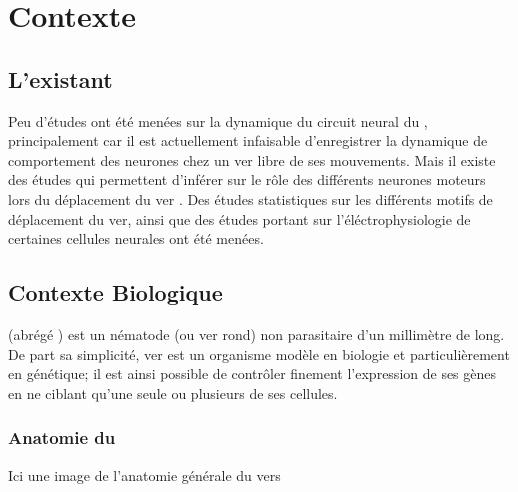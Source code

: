 \chapter{Contexte} %
\label{cha:Contexte}

\section{L'existant} %
\label{sec:L'existant}

Peu d'études ont été menées sur la dynamique du circuit neural du \celeg{},
principalement car il est actuellement infaisable d'enregistrer la dynamique de
comportement des neurones chez un ver libre de ses mouvements.  Mais il existe
des études qui permettent d'inférer sur le rôle des différents neurones moteurs
lors du déplacement du ver \cite{Yanik2006,Chronis2007,Leifer2011}.  Des études
statistiques sur les différents motifs de déplacement \cite{Gray2005} du ver,
ainsi que des études portant sur l'éléctrophysiologie de certaines cellules
neurales \cite{Mellem2008a,Lockery2009} ont été menées.


\section{Contexte Biologique} %
\label{sec:Contexte Biologique}

\caeleg{} (abrégé \celeg{}) est un nématode (ou ver rond) non parasitaire d'un
millimètre de long. De part sa simplicité, ver est un organisme modèle en biologie
et particulièrement en génétique; il est ainsi possible de contrôler
finement l'expression de ses gènes en ne ciblant qu'une seule ou plusieurs de
ses cellules.

\subsection{Anatomie du \celeg{}} %
\label{sub:Anatomie du caeleg}

\begin{center}
   Ici une image de l'anatomie générale du vers
\end{center}

